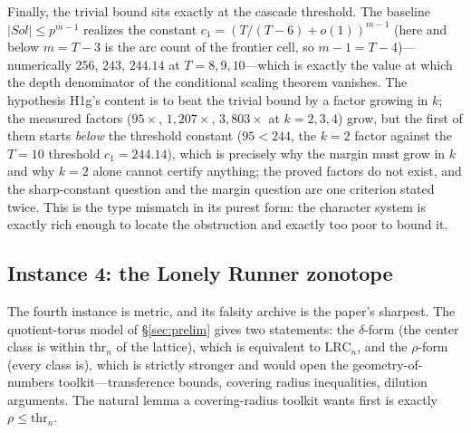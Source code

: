 \documentclass[11pt,a4paper]{article}
\numberwithin{equation}{section}
\theoremstyle{plain}
\theoremstyle{definition}
\theoremstyle{remark}
\newcommand{\lrc}{\mathrm{LRC}}
\begin{document}
Finally, the trivial bound sits exactly at the cascade threshold. The
baseline $|Sol|\le p^{m-1}$ realizes the constant
$c_1=(T/(T-6)+o(1))^{m-1}$ (here and below $m=T-3$ is the arc count of
the frontier cell, so $m-1=T-4$)---numerically $256$, $243$, $244.14$ at
$T=8,9,10$---which is exactly the value at which the depth denominator
of the conditional scaling theorem vanishes. The hypothesis H1g's
content is to beat the trivial bound by a factor growing in $k$; the
measured factors ($95\times$, $1{,}207\times$, $3{,}803\times$ at
$k=2,3,4$) grow, but the first of them starts \emph{below} the
threshold constant ($95<244$, the $k=2$ factor against the $T=10$
threshold $c_1=244.14$), which is precisely why the margin must
grow in $k$ and why $k=2$ alone cannot certify anything; the proved
factors do not exist, and the sharp-constant question and the margin
question are one criterion stated twice. This is the type mismatch in its purest
form: the character system is exactly rich enough to locate the
obstruction and exactly too poor to bound it.

\subsection{Instance 4: the Lonely Runner zonotope}\label{sec:tm-zono}

The fourth instance is metric, and its falsity archive is the paper's
sharpest. The quotient-torus model of \S\ref{sec:prelim} gives two
statements: the $\delta$-form (the center class is within
$\mathrm{thr}_n$ of the lattice), which is equivalent to $\lrc_n$, and
the $\rho$-form (every class is), which is strictly stronger and would
open the geometry-of-numbers toolkit---transference bounds, covering
radius inequalities, dilution arguments. The natural lemma a
covering-radius toolkit wants first is exactly $\rho\le\mathrm{thr}_n$.
\end{document}
